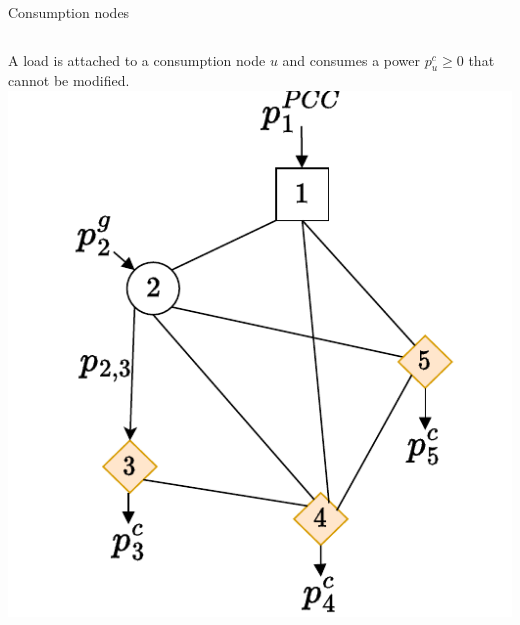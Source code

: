 \begin{frame}{Consumption nodes}
\begin{columns}
    A load is attached to a consumption node $u$ and consumes a power $p^c_u \geq 0$ that cannot be modified.
\includegraphics[width=\textwidth]{images/netwok_flow-Page-5_drawio.pdf}
\end{columns}
\end{frame}

